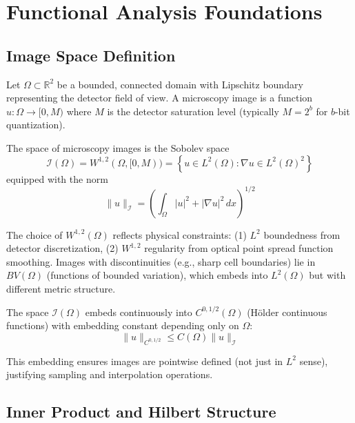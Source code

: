 \documentclass[twocolumn,11pt]{article}
\begin{document}
\section{Functional Analysis Foundations}

\subsection{Image Space Definition}

Let $\Omega \subset \mathbb{R}^2$ be a bounded, connected domain with Lipschitz boundary representing the detector field of view. A microscopy image is a function $u: \Omega \to [0, M)$ where $M$ is the detector saturation level (typically $M = 2^b$ for $b$-bit quantization).

\begin{definition}
The space of microscopy images is the Sobolev space
\begin{equation}
\mathcal{I}(\Omega) = W^{1,2}(\Omega, [0, M)) = \left\{ u \in L^2(\Omega) : \nabla u \in L^2(\Omega)^2 \right\}
\end{equation}
equipped with the norm
\begin{equation}
\|u\|_{\mathcal{I}} = \left(\int_\Omega |u|^2 + |\nabla u|^2 \, dx\right)^{1/2}
\end{equation}
\end{definition}

The choice of $W^{1,2}(\Omega)$ reflects physical constraints: (1) $L^2$ boundedness from detector discretization, (2) $W^{1,2}$ regularity from optical point spread function smoothing. Images with discontinuities (e.g., sharp cell boundaries) lie in $BV(\Omega)$ (functions of bounded variation), which embeds into $L^2(\Omega)$ but with different metric structure.

\begin{proposition}
The space $\mathcal{I}(\Omega)$ embeds continuously into $C^{0,1/2}(\Omega)$ (Hölder continuous functions) with embedding constant depending only on $\Omega$:
\begin{equation}
\|u\|_{C^{0,1/2}} \leq C(\Omega) \|u\|_{\mathcal{I}}
\end{equation}
\end{proposition}

This embedding ensures images are pointwise defined (not just in $L^2$ sense), justifying sampling and interpolation operations.

\subsection{Inner Product and Hilbert Structure}
\end{document}
